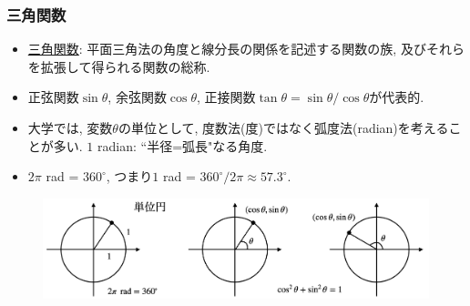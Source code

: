 \documentclass[dvipdfmx,cjk,10.2pt]{beamer}
\theoremstyle{definition}
\begin{document}
\begin{frame}
\frametitle{三角関数}

\begin{itemize}
\item 
\underline{三角関数}: 平面三角法の角度と線分長の関係を記述する関数の族, 及びそれらを拡張して得られる関数の総称. 
\item 正弦関数$\sin \theta$, 余弦関数$\cos \theta$, 正接関数$\tan \theta= \sin \theta / \cos \theta$が代表的. 
\item 大学では, 変数$\theta$の単位として, 度数法(度)ではなく弧度法(radian)を考えることが多い. 
$1$ radian: ``半径=弧長"なる角度. 
\item $2\pi$ rad = $360^\circ$, つまり$1$ rad =  $360^\circ/2 \pi \approx 57.3 ^\circ$. 
\end{itemize}

\vspace{-2mm}

\begin{figure}[htbp]
 \begin{center} 
  \includegraphics[width=115mm]{radian.png}
 \end{center}
\end{figure}
\vspace{-2mm}

\end{frame}




\end{document}
